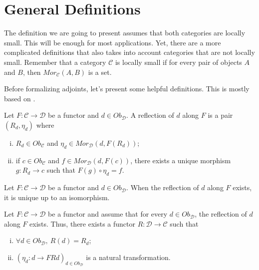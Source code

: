 

\section{General Definitions}

The definition we are going to present assumes that both categories are locally small. This will
be enough for most applications. Yet, there are a more complicated definitions that also takes into
account categories that are not locally small. Remember that a category $\mathcal C$
is locally small if for every pair of objects $A$ and $B$, then $Mor_\mathcal C (A,B)$ is a set.

Before formalizing adjoints, let's present some helpful definitions. This is mostly based
on \citet{borceux1994handbook}.

\begin{definition}[Reflection]
	Let $F:\mathcal C \to \mathcal D$ be a functor and $d \in Ob_\mathcal D$.
	A reflection of $d$ along $F$ is a pair $(R_d, \eta_d)$ where
	\begin{enumerate}[(i)]
		\item $R_d \in Ob_\mathcal C$ and $\eta_d \in Mor_{\mathcal D}(d, F(R_d))$;
		\item if $c \in Ob_\mathcal C$ and $f \in Mor_{\mathcal D}(d,F(c))$, there exists
		      a unique morphism $g:R_d \to c$ such that
		      $F(g) \circ \eta_d = f$.
	\end{enumerate}
\end{definition}

\begin{proposition}
	Let $F:\mathcal C \to \mathcal D$ be a functor and $d \in Ob_\mathcal D$.
	When the reflection of $d$ along $F$ exists, it is unique up to an isomorphism.
\end{proposition}

\begin{proposition}
	Let $F:\mathcal C \to \mathcal D$ be a functor and assume that for every
	$d \in Ob_\mathcal D$, the reflection of $d$ along $F$ exists. Thus, there
	exists a functor $R:\mathcal D \to \mathcal C$ such that
	\begin{enumerate}[(i)]
		\item $\forall d \in Ob_\mathcal D, \ R(d) = R_d$;
		\item $(\eta_d:d \to FRd)_{d \in Ob_\mathcal D}$ is a natural transformation.
	\end{enumerate}
\end{proposition}

